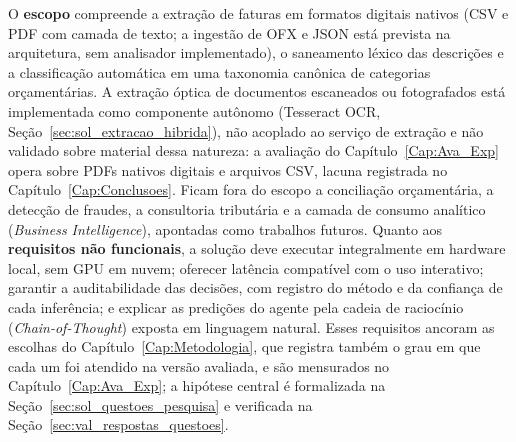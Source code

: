 O \textbf{escopo} compreende a extração de faturas em formatos digitais nativos (CSV e PDF com camada de texto; a ingestão de OFX e JSON está prevista na arquitetura, sem analisador implementado), o saneamento léxico das descrições e a classificação automática em uma taxonomia canônica de categorias orçamentárias. A extração óptica de documentos escaneados ou fotografados está implementada como componente autônomo (Tesseract OCR, Seção~\ref{sec:sol_extracao_hibrida}), não acoplado ao serviço de extração e não validado sobre material dessa natureza: a avaliação do Capítulo~\ref{Cap:Ava_Exp} opera sobre PDFs nativos digitais e arquivos CSV, lacuna registrada no Capítulo~\ref{Cap:Conclusoes}. Ficam fora do escopo a conciliação orçamentária, a detecção de fraudes, a consultoria tributária e a camada de consumo analítico (\textit{Business Intelligence}), apontadas como trabalhos futuros. Quanto aos \textbf{requisitos não funcionais}, a solução deve executar integralmente em hardware local, sem GPU em nuvem; oferecer latência compatível com o uso interativo; garantir a auditabilidade das decisões, com registro do método e da confiança de cada inferência; e explicar as predições do agente pela cadeia de raciocínio (\textit{Chain-of-Thought}) exposta em linguagem natural. Esses requisitos ancoram as escolhas do Capítulo~\ref{Cap:Metodologia}, que registra também o grau em que cada um foi atendido na versão avaliada, e são mensurados no Capítulo~\ref{Cap:Ava_Exp}; a hipótese central é formalizada na Seção~\ref{sec:sol_questoes_pesquisa} e verificada na Seção~\ref{sec:val_respostas_questoes}.

